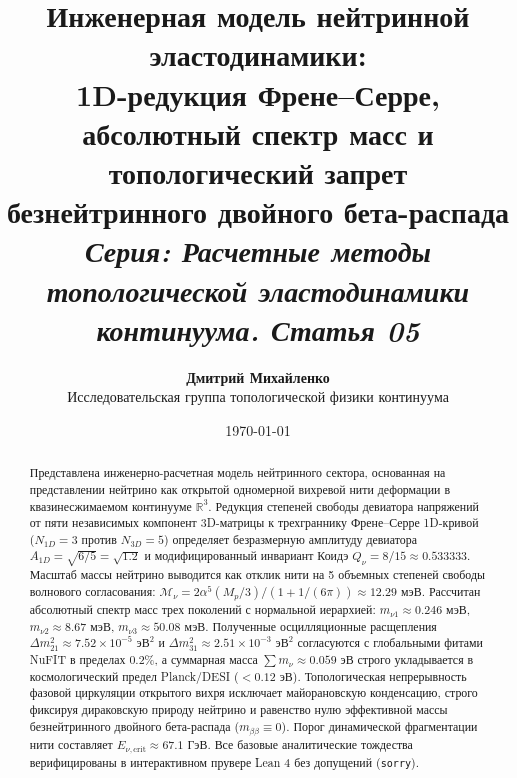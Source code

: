 \documentclass[11pt,a4paper]{article}
\theoremstyle{definition}
\theoremstyle{remark}
\begin{document}
\title{\textbf{\Large Инженерная модель нейтринной эластодинамики:}\\
\large 1D-редукция Френе--Серре, абсолютный спектр масс и топологический запрет безнейтринного двойного бета-распада\\[2mm]
\normalsize \textit{Серия: Расчетные методы топологической эластодинамики континуума. Статья 05}}

\author{\textbf{Дмитрий Михайленко}\\[1mm]
\small Исследовательская группа топологической физики континуума}

\date{\today}

\maketitle

\begin{abstract}
\noindent Представлена инженерно-расчетная модель нейтринного сектора, основанная на представлении нейтрино как открытой одномерной вихревой нити деформации в квазинесжимаемом континууме $\mathbb{R}^3$. Редукция степеней свободы девиатора напряжений от пяти независимых компонент 3D-матрицы к трехграннику Френе--Серре 1D-кривой ($N_{1D} = 3$ против $N_{3D} = 5$) определяет безразмерную амплитуду девиатора $A_{1D} = \sqrt{6/5} = \sqrt{1.2}$ и модифицированный инвариант Коидэ $Q_\nu = 8/15 \approx 0.533333$. Масштаб массы нейтрино выводится как отклик нити на 5 объемных степеней свободы волнового согласования: $\mathcal{M}_\nu = 2 \alpha^5 (M_p/3) / (1 + 1/(6\pi)) \approx 12.29\text{ мэВ}$. Рассчитан абсолютный спектр масс трех поколений с нормальной иерархией: $m_{\nu 1} \approx 0.246\text{ мэВ}$, $m_{\nu 2} \approx 8.67\text{ мэВ}$, $m_{\nu 3} \approx 50.08\text{ мэВ}$. Полученные осцилляционные расщепления $\Delta m_{21}^2 \approx 7.52 \times 10^{-5}\text{ эВ}^2$ и $\Delta m_{31}^2 \approx 2.51 \times 10^{-3}\text{ эВ}^2$ согласуются с глобальными фитами NuFIT в пределах $0.2\%$, а суммарная масса $\sum m_\nu \approx 0.059\text{ эВ}$ строго укладывается в космологический предел Planck/DESI ($< 0.12\text{ эВ}$). Топологическая непрерывность фазовой циркуляции открытого вихря исключает майорановскую конденсацию, строго фиксируя дираковскую природу нейтрино и равенство нулю эффективной массы безнейтринного двойного бета-распада ($m_{\beta\beta} \equiv 0$). Порог динамической фрагментации нити составляет $E_{\nu, \mathrm{crit}} \approx 67.1\text{ ГэВ}$. Все базовые аналитические тождества верифицированы в интерактивном прувере Lean 4 без допущений (\texttt{sorry}).
\end{abstract}
\end{document}

